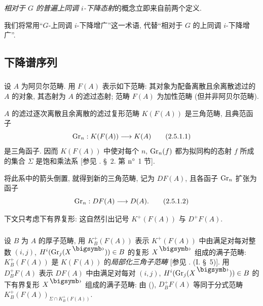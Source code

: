 \emph{相对于 $G$ 的普遍上同调 $i$-下降态射}的概念立即来自前两个定义.

我们将常用“$G$-上同调 $i$-下降增广”这一术语,
代替“相对于 $G$ 的上同调 $i$-下降增广”.

\subsection{下降谱序列}





\subsubsection{}
设 $A$ 为阿贝尔范畴. 用 $F(A)$ 表示如下范畴:
其对象为配备离散且余离散滤过的 $A$ 的对象, 其态射为 $A$ 的滤过态射;
范畴 $F(A)$ 为加性范畴 (但并非阿贝尔范畴).

$A$ 的滤过逐次离散且余离散的滤过复形范畴 $K(F(A))$ 是三角范畴,
且典范函子
\begin{equation*}
\operatorname{Gr}_n : K(F(A)) \longrightarrow K(A)\tag{2.5.1.1}
\end{equation*}
是三角函子. 因而 $K(F(A))$ 中使对每个 $n$, $\operatorname{Gr}_n(f)$ 都为拟同构的态射 $f$
所成的集合 $\Sigma$ 是饱和乘法系
[参见 \cite{sga4.exp.Vbis.bib.9}. \S~2. 第 ${\rm n^\circ}$ 1 节].

将此系中的箭头倒置, 就得到新的三角范畴, 记为 $D F(A)$,
且各函子 $\operatorname{Gr}_n$ 扩张为函子
\begin{equation*}
\operatorname{Gr}_n : D F(A) \longrightarrow D(A){}.\tag{2.5.1.2}
\end{equation*}

下文只考虑下有界复形: 这自然引出记号 $K^+(F(A))$ 与 $D^+ F(A)$.

\subsubsection{}
设\pageoriginale{} $B$ 为 $A$ 的厚子范畴,
用 $K^+_B(F(A))$ 表示 $K^+(F(A))$ 中由满足对每对整数 $(i, j)$,
$H^{i}(\Gr_j(X^{\bigdot})) \in B$ 的复形 $X^{\bigdot}$ 组成的满子范畴:
$K_B^+(F(A))$ 是 $K(F(A))$ 的\emph{局部化三角子范畴}
[参见 \cite{sga4.exp.Vbis.bib.7}. (I. \S\ 5)].
用 $D_B^+ F(A)$ 表示 $D F(A)$ 中由满足对每对 $(i, j)$,
$H^i(\Gr_j(X^{\bigdot})) \in B$ 的下有界复形 $X^{\bigdot}$ 组成的满子范畴:
由 (\loccit), $D^+_B F(A)$ 等同于分式范畴
$K^+_B(F(A))_{\Sigma \cap K^{+}_{B} (F(A))}$.

